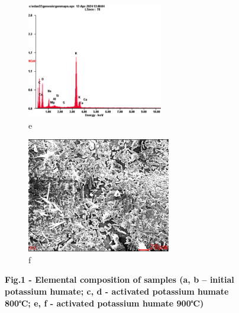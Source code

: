 \begin{figure}[H]
    \begin{subfigure}[t]{0.45\textwidth}
        \centering
        \includegraphics[height=5cm]{media/chem2/image91}
        \caption*{e}
    \end{subfigure}
    \begin{subfigure}[t]{0.45\textwidth}
        \centering
        \includegraphics[height=5cm]{media/chem2/image92}
        \caption*{f}
    \end{subfigure}
    \caption*{{\bfseries Fig.1 - Elemental composition of samples (a, b -- initial potassium humate; c, d - activated potassium humate 800℃; e, f - activated potassium humate 900℃)}}
\end{figure}

